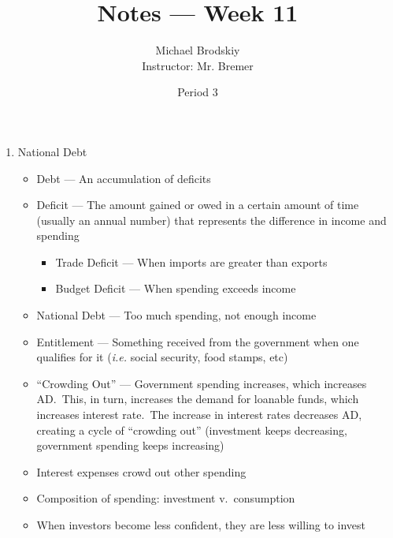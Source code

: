 \documentclass[12pt]{article}
\title{Notes — Week 11}
\date{Period 3}
\author{Michael Brodskiy\\ \small Instructor: Mr. Bremer}
\begin{document}
\maketitle

\begin{enumerate}

  \item National Debt

    \begin{itemize}

      \item Debt — An accumulation of deficits

      \item Deficit — The amount gained or owed in a certain amount of time (usually an annual number) that represents the difference in income and spending

        \begin{itemize}
            
          \item Trade Deficit — When imports are greater than exports

          \item Budget Deficit — When spending exceeds income

        \end{itemize}

      \item National Debt — Too much spending, not enough income

      \item Entitlement — Something received from the government when one qualifies for it (\textit{i.e.} social security, food stamps, etc)

      \item “Crowding Out” — Government spending increases, which increases AD.\ This, in turn, increases the demand for loanable funds, which increases interest rate.\ The increase in interest rates decreases AD, creating a cycle of “crowding out” (investment keeps decreasing, government spending keeps increasing)

      \item Interest expenses crowd out other spending

      \item Composition of spending: investment v.\ consumption

      \item When investors become less confident, they are less willing to invest


\end{itemize}
\end{enumerate}
\end{document}
